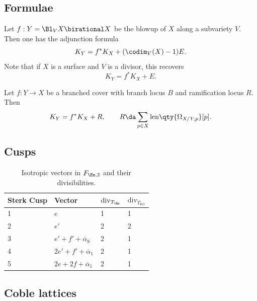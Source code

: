 \documentclass[../../main.tex]{subfiles}
\begin{document}
\subsection{Formulae}

\begin{remark}
    Let $f: Y = \Bl_V X \birational X$ be the blowup of $X$ along a subvariety $V$. Then one has the adjunction formula
    \[
    K_Y = f^* K_X + (\codim_V(X) - 1)E
    .\]
    Note that if $X$ is a surface and $V$ is a divisor, this recovers 
    \[
    K_Y = f^* K_X + E
    .\]
\end{remark}

\begin{remark}
    Let $f: Y\to X$ be a branched cover with branch locus $B$ and ramification locus $R$. Then
    \[
    K_Y = f^* K_X + R, \qquad R \da \sum_{p\in X} \mathrm{len}\qty{ \Omega_{X/Y, p}} [p]
    .\]
\end{remark}

\subsection{Cusps}

\begin{table}[H]
\centering
\begin{tabular}{@{}llll@{}}
\toprule
Sterk Cusp & Vector                           & $\mathrm{div}_{T_\En}$ & $\mathrm{div}_{T_{\mathrm{K3} } }$ \\ \midrule
1          & $e$                              & 1                      & 1                                  \\
2          & $e'$                             & 2                      & 2                                  \\
3          & $e' + f' + \overline{\alpha}_8$  & 2                      & 1                                  \\
4          & $2e' + f' + \overline{\alpha}_1$ & 2                      & 1                                  \\
5          & $2e + 2f + \overline{\alpha}_1$  & 2                      & 1                                  \\ \bottomrule
\end{tabular}
\caption{Isotropic vectors in $F_{\En, 2}$ and their divisibilities.}
\label{tab:sterk-cusps}
\end{table}

\subsection{Coble lattices}
\end{document}

